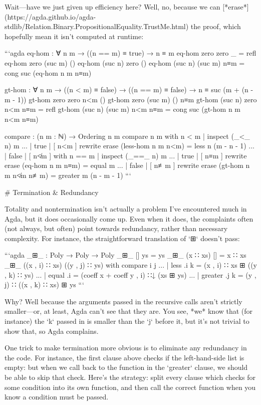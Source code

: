 \documentclass{article}
\begin{document}
Wait---have we just given up efficiency here? Well, no, because we can
[*erase*](https://agda.github.io/agda-stdlib/Relation.Binary.PropositionalEquality.TrustMe.html)
the proof, which hopefully mean it isn't computed at runtime:

```agda
eq-hom : ∀ n m → ((n == m) ≡ true) → n ≡ m
eq-hom zero zero _ = refl
eq-hom zero (suc m) ()
eq-hom (suc n) zero ()
eq-hom (suc n) (suc m) n≡m = cong suc (eq-hom n m n≡m)

gt-hom : ∀ n m → ((n < m) ≡ false) → ((n == m) ≡ false) → n ≡ suc (m + (n - m - 1))
gt-hom zero zero n<m ()
gt-hom zero (suc m) () n≡m
gt-hom (suc n) zero n<m n≡m = refl
gt-hom (suc n) (suc m) n<m n≡m = cong suc (gt-hom n m n<m n≡m)

compare : (n m : ℕ) → Ordering n m
compare n m with n < m  | inspect (_<_ n) m
... | true  | [ n<m ] rewrite erase (less-hom n m n<m) = less n (m - n - 1)
... | false | [ n≮m ] with n == m | inspect (_==_ n) m
... | true  | [ n≡m ] rewrite erase (eq-hom n m n≡m) = equal m
... | false | [ n≢m ] rewrite erase (gt-hom n m n≮m n≢m) = greater m (n - m - 1)
```

# Termination & Redundancy

Totality and nontermination isn't actually a problem I've encountered much in
Agda, but it does occasionally come up. Even when it does, the complaints often
(not always, but often) point towards redundancy, rather than necessary
complexity. For instance, the straightforward translation of `⊞` doesn't pass:

```agda
_⊞_ : Poly → Poly → Poly
_⊞_ [] ys = ys
_⊞_ (x ∷ xs) [] = x ∷ xs
_⊞_ ((x , i) ∷ xs) ((y , j) ∷ ys) with compare i j
... | less    .i k = (x , i) ∷ xs ⊞ ((y , k) ∷ ys)
... | equal   .i   = (coeff x + coeff y , i) ∷↓ (xs ⊞ ys)
... | greater .j k = (y , j) ∷ ((x , k) ∷ xs) ⊞ ys
```

Why? Well because the arguments passed in the recursive calls aren't strictly
smaller---or, at least, Agda can't see that they are. You see, *we* know that
(for instance) the `k` passed in is smaller than the `j` before it, but it's not
trivial to show that, so Agda complains.

One trick to make termination more obvious is to eliminate any redundancy in
the code. For instance, the first clause above checks if the left-hand-side list
is empty: but when we call back to the function in the `greater` clause, we
should be able to skip that check. Here's the strategy: split every clause which
checks for some condition into its own function, and then call the correct
function when you know a condition must be passed. 
\end{document}
